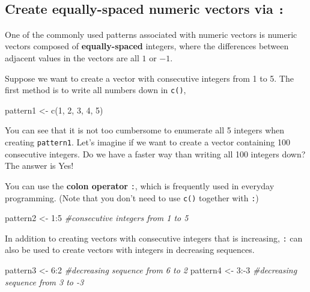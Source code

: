 \documentclass[
]{book}
\newenvironment{Shaded}{\begin{snugshade}}{\end{snugshade}}
\newcommand{\CommentTok}[1]{\textcolor[rgb]{0.56,0.35,0.01}{\textit{#1}}}
\newcommand{\DecValTok}[1]{\textcolor[rgb]{0.00,0.00,0.81}{#1}}
\newcommand{\FunctionTok}[1]{\textcolor[rgb]{0.00,0.00,0.00}{#1}}
\newcommand{\NormalTok}[1]{#1}
\newcommand{\OtherTok}[1]{\textcolor[rgb]{0.56,0.35,0.01}{#1}}
\newcommand{\SpecialCharTok}[1]{\textcolor[rgb]{0.00,0.00,0.00}{#1}}
\begin{document}
\hypertarget{create-equally-spaced-numeric-vectors-via}{%
\subsection{\texorpdfstring{Create equally-spaced numeric vectors via \texttt{:}}{Create equally-spaced numeric vectors via :}}\label{create-equally-spaced-numeric-vectors-via}}

One of the commonly used patterns associated with numeric vectors is numeric vectors composed of \textbf{equally-spaced} integers, where the differences between adjacent values in the vectors are all \(1\) or \(-1\).

Suppose we want to create a vector with consecutive integers from 1 to 5. The first method is to write all numbers down in \texttt{c()},

\begin{Shaded}
\begin{Highlighting}[]
\NormalTok{pattern1 }\OtherTok{\textless{}{-}} \FunctionTok{c}\NormalTok{(}\DecValTok{1}\NormalTok{, }\DecValTok{2}\NormalTok{, }\DecValTok{3}\NormalTok{, }\DecValTok{4}\NormalTok{, }\DecValTok{5}\NormalTok{)}
\end{Highlighting}
\end{Shaded}

You can see that it is not too cumbersome to enumerate all 5 integers when creating \texttt{pattern1}. Let's imagine if we want to create a vector containing 100 consecutive integers. Do we have a faster way than writing all 100 integers down? The answer is Yes!

You can use the \textbf{colon operator} \texttt{:}, which is frequently used in everyday programming. (Note that you don't need to use \texttt{c()} together with \texttt{:})

\begin{Shaded}
\begin{Highlighting}[]
\NormalTok{pattern2 }\OtherTok{\textless{}{-}} \DecValTok{1}\SpecialCharTok{:}\DecValTok{5} \CommentTok{\#consecutive integers from 1 to 5}
\end{Highlighting}
\end{Shaded}

In addition to creating vectors with consecutive integers that is increasing, \texttt{:} can also be used to create vectors with integers in decreasing sequences.

\begin{Shaded}
\begin{Highlighting}[]
\NormalTok{pattern3 }\OtherTok{\textless{}{-}} \DecValTok{6}\SpecialCharTok{:}\DecValTok{2}  \CommentTok{\#decreasing sequence from 6 to 2}
\NormalTok{pattern4 }\OtherTok{\textless{}{-}} \DecValTok{3}\SpecialCharTok{:{-}}\DecValTok{3} \CommentTok{\#decreasing sequence from 3 to {-}3}
\end{Highlighting}
\end{Shaded}
\end{document}
